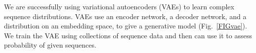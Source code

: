 \documentclass[nobib]{tufte-handout}
\begin{document}
We are successfully using variational autoencoders (VAEs) \cite{Kingma2014-mo} to learn complex sequence distributions.
VAEs use an encoder network, a decoder network, and a distribution on an embedding space, to give a generative model (Fig.~\ref{FIGvae}).
We train the VAE using collections of sequence data and then can use it to assess probability of given sequences.




\newpage


\end{document}
